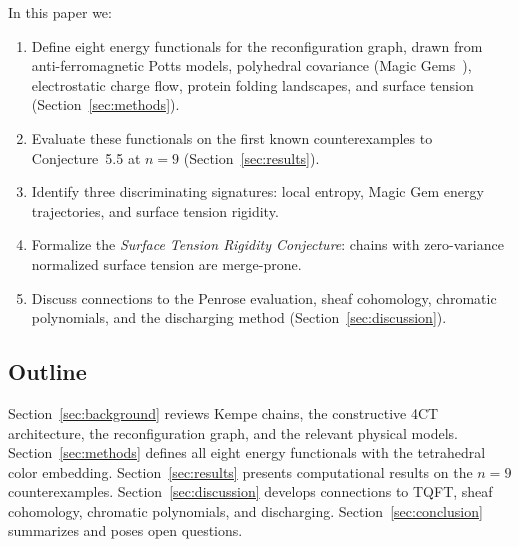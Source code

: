 In this paper we:
\begin{enumerate}[label=(\roman*)]
  \item Define eight energy functionals for the reconfiguration graph,
    drawn from anti-ferromagnetic Potts models, polyhedral covariance
    (Magic Gems~\cite{mathewson2025}), electrostatic charge flow,
    protein folding landscapes, and surface tension
    (Section~\ref{sec:methods}).
  \item Evaluate these functionals on the first known counterexamples to
    Conjecture~5.5 at $n = 9$ (Section~\ref{sec:results}).
  \item Identify three discriminating signatures: local entropy, Magic
    Gem energy trajectories, and surface tension rigidity.
  \item Formalize the \emph{Surface Tension Rigidity Conjecture}: chains
    with zero-variance normalized surface tension are merge-prone.
  \item Discuss connections to the Penrose evaluation, sheaf cohomology,
    chromatic polynomials, and the discharging method
    (Section~\ref{sec:discussion}).
\end{enumerate}

\subsection{Outline}

Section~\ref{sec:background} reviews Kempe chains, the constructive 4CT
architecture, the reconfiguration graph, and the relevant physical
models. Section~\ref{sec:methods} defines all eight energy functionals
with the tetrahedral color embedding. Section~\ref{sec:results} presents
computational results on the $n = 9$ counterexamples.
Section~\ref{sec:discussion} develops connections to TQFT, sheaf
cohomology, chromatic polynomials, and discharging.
Section~\ref{sec:conclusion} summarizes and poses open questions.
